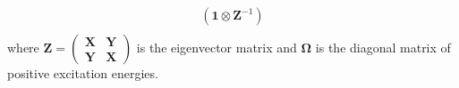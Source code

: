 \begin{align}
\left( \bm{1} \otimes \bm{Z}^{-1}\right)\\
\end{align}
where $\bm{Z}=\begin{pmatrix} \bm{X} & \bm{Y} \\ \bm{Y} & \bm{X} \end{pmatrix}$ is the eigenvector matrix and $\bm{\Omega}$ is the diagonal matrix of positive excitation energies.
